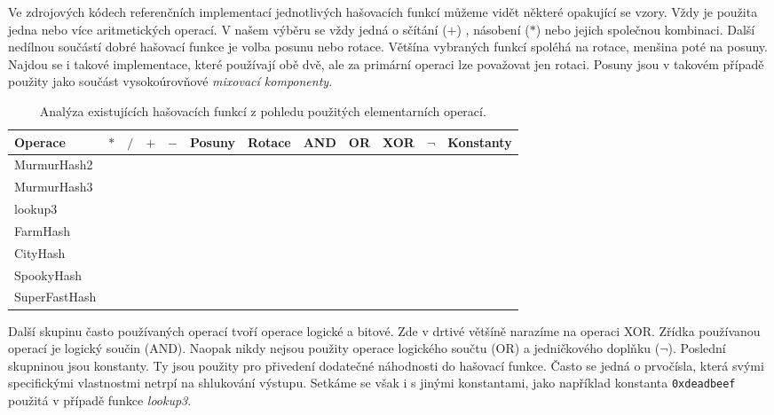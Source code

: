 Ve zdrojových kódech referenčních implementací jednotlivých hašovacích funkcí můžeme vidět některé opakující se vzory.
Vždy je použita jedna nebo více aritmetických operací. V našem výběru se vždy jedná o sčítání ($+$) , násobení  ($*$) nebo
jejich společnou kombinaci. Další nedílnou součástí dobré hašovací funkce je volba posunu nebo rotace. Většína vybraných
funkcí spoléhá na rotace, menšina poté na posuny. Najdou se i takové implementace, které používají obě dvě, ale za
primární operaci lze považovat jen rotaci. Posuny jsou v takovém případě použity jako součást vysokoúrovňové 
\textit{mixovací komponenty}.

\begin{table}[!ht]
	\centering
	\begin{tabular}{lccccccccccc}
		\hline
		Operace            & $*$ & $/$ & $+$ & $-$ & Posuny & Rotace & AND & OR & XOR & $\neg$ & Konstanty \\
		\hline
		MurmurHash2   & \checkmark & & & & \checkmark & & & & \checkmark & & \checkmark \\
		MurmurHash3   & \checkmark & & \checkmark & &  & \checkmark & & & \checkmark & & \checkmark \\
		lookup3              & & & \checkmark & \checkmark & & \checkmark & & & \checkmark & & \checkmark \\
		FarmHash         & \checkmark & & \checkmark & & \checkmark & \checkmark & \checkmark & & \checkmark & & \checkmark  \\
		CityHash          & \checkmark & & \checkmark & & \checkmark & \checkmark & & & \checkmark & & \checkmark \\
		SpookyHash     & & & \checkmark & & & \checkmark & & & \checkmark & & \\
		SuperFastHash & & & \checkmark & & \checkmark & & & & \checkmark & & \\
		\hline		
	\end{tabular}
	\label{tab:generic_hashes_analysis}
	\caption{Analýza existujících hašovacích funkcí z pohledu použitých elementarních operací.}
\end{table}

Další skupinu často používaných operací tvoří operace logické a bitové. Zde v drtivé většíně narazíme na operaci XOR. Zřídka
používanou operací je logický součin (AND). Naopak nikdy nejsou použity operace logického součtu (OR) a jedničkového
doplňku ($\neg$). Poslední skupninou jsou konstanty. Ty jsou použity pro přivedení dodatečné náhodnosti do hašovací funkce.
Často se jedná o prvočísla, která svými specifickými vlastnostmi netrpí na shlukování výstupu. Setkáme se však i s jinými 
konstantami, jako například konstanta \texttt{0xdeadbeef} použitá v případě funkce \textit{lookup3}.

